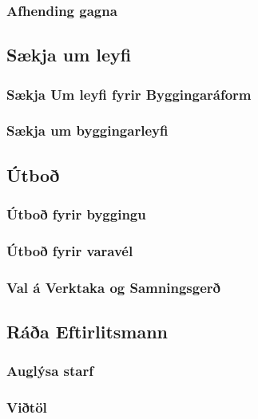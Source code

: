 \documentclass[11pt]{article}
\begin{document}
\subsubsection{Afhending gagna}
\label{sec-1.3.5}

\subsection{Sækja um leyfi}
\label{sec-1.4}

\subsubsection{Sækja Um leyfi fyrir Byggingaráform}
\label{sec-1.4.1}

\subsubsection{Sækja um byggingarleyfi}
\label{sec-1.4.2}

\subsection{Útboð}
\label{sec-1.5}

\subsubsection{Útboð fyrir byggingu}
\label{sec-1.5.1}

\subsubsection{Útboð fyrir varavél}
\label{sec-1.5.2}

\subsubsection{Val á Verktaka og Samningsgerð}
\label{sec-1.5.3}

\subsection{Ráða Eftirlitsmann}
\label{sec-1.6}

\subsubsection{Auglýsa starf}
\label{sec-1.6.1}

\subsubsection{Viðtöl}
\label{sec-1.6.2}
\end{document}
